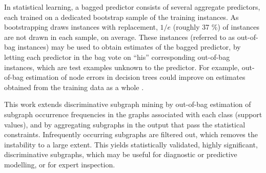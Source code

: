 \documentclass{sig-alternate}
\begin{document}

In statistical learning, a bagged predictor consists of several aggregate
predictors, each trained on a dedicated bootstrap sample of the training
instances. As bootstrapping draws instances with replacement, $1/e$ (roughly 37
\%) of instances are not drawn in each sample, on average. These instances
(referred to as out-of-bag instances) may be used to obtain estimates of the
bagged predictor, by letting each predictor in the bag vote on ``his'' corresponding 
out-of-bag instances, 
which are test examples unknown to the predictor.
For example, out-of-bag estimation of node errors in
decision trees could improve on estimates obtained from the training data as a
whole \cite{breiman96oob}.

This work extends discriminative subgraph mining by out-of-bag estimation of 
subgraph occurrence frequencies in the graphs associated with each class (support values), 
and by aggregating subgraphs in the output that pass the
statistical constraints. Infrequently occurring subgraphs are filtered out, 
which removes the instability to a large extent. 
This yields statistically validated, highly significant,
discriminative subgraphs, which may be useful for diagnostic or predictive
modelling, or for expert inspection. 
\end{document}
